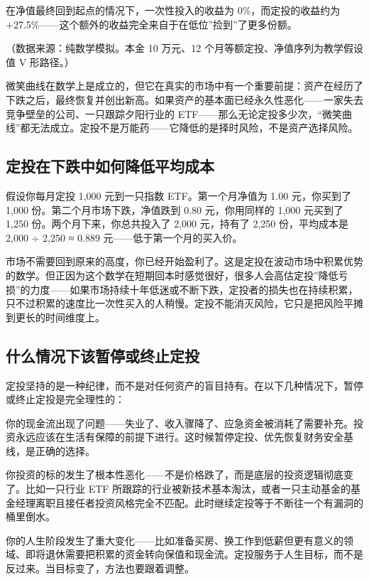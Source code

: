 \documentclass[a4paper,11pt,oneside,fontset=none,UTF8,zihao=-4]{ctexbook}
\begin{document}
在净值最终回到起点的情况下，一次性投入的收益为 0\%，而定投的收益约为
+27.5\%------这个额外的收益完全来自于在低位''捡到''了更多份额。

（数据来源：纯数学模拟。本金 10 万元、12
个月等额定投、净值序列为教学假设值 V 形路径。）

微笑曲线在数学上是成立的，但它在真实的市场中有一个重要前提：资产在经历了下跌之后，最终恢复并创出新高。如果资产的基本面已经永久性恶化------一家失去竞争壁垒的公司、一只跟踪夕阳行业的
ETF------那么无论定投多少次，``微笑曲线''都无法成立。定投不是万能药------它降低的是择时风险，不是资产选择风险。

\subsection{定投在下跌中如何降低平均成本}\label{ux5b9aux6295ux5728ux4e0bux8dccux4e2dux5982ux4f55ux964dux4f4eux5e73ux5747ux6210ux672c}

假设你每月定投 1,000 元到一只指数 ETF。第一个月净值为 1.00 元，你买到了
1,000 份。第二个月市场下跌，净值跌到 0.80 元，你用同样的 1,000 元买到了
1,250 份。两个月下来，你总共投入了 2,000 元，持有了 2,250 份，平均成本是
2,000 ÷ 2,250 ≈ 0.889 元------低于第一个月的买入价。

市场不需要回到原来的高度，你已经开始盈利了。这是定投在波动市场中积累优势的数学。但正因为这个数学在短期回本时感觉很好，很多人会高估定投''降低亏损''的力度------如果市场持续十年低迷或不断下跌，定投者的损失也在持续积累，只不过积累的速度比一次性买入的人稍慢。定投不能消灭风险，它只是把风险平摊到更长的时间维度上。

\subsection{什么情况下该暂停或终止定投}\label{ux4ec0ux4e48ux60c5ux51b5ux4e0bux8be5ux6682ux505cux6216ux7ec8ux6b62ux5b9aux6295}

定投坚持的是一种纪律，而不是对任何资产的盲目持有。在以下几种情况下，暂停或终止定投是完全理性的：

你的现金流出现了问题------失业了、收入骤降了、应急资金被消耗了需要补充。投资永远应该在生活有保障的前提下进行。这时候暂停定投、优先恢复财务安全基线，是正确的选择。

你投资的标的发生了根本性恶化------不是价格跌了，而是底层的投资逻辑彻底变了。比如一只行业
ETF
所跟踪的行业被新技术基本淘汰，或者一只主动基金的基金经理离职且接任者投资风格完全不匹配。此时继续定投等于不断往一个有漏洞的桶里倒水。

你的人生阶段发生了重大变化------比如准备买房、换工作到低薪但更有意义的领域、即将退休需要把积累的资金转向保值和现金流。定投服务于人生目标，而不是反过来。当目标变了，方法也要跟着调整。
\end{document}
